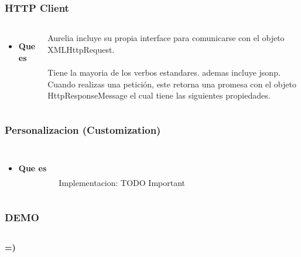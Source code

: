 \documentclass{beamer}
\begin{document}
\begin{frame}
\frametitle{HTTP Client}
\begin{columns}[c]
\begin{itemize}
\item \textbf{Que es}
\end{itemize}

Aurelia incluye su propia interface para comunicarse con el objeto XMLHttpRequest.
\\~\\
Tiene la mayoria de los verbos estandares. ademas incluye jsonp.
Cuando realizas una petición, este retorna una promesa con el objeto HttpResponseMessage el cual tiene las siguientes propiedades.
\end{columns}
\end{frame}
\begin{frame}
\frametitle{Personalizacion (Customization)}
\begin{columns}[c]
\begin{itemize}
\item \textbf{Que es}
\end{itemize}

\\~\\
Implementacion: TODO Important
\end{columns}
\end{frame}
\begin{frame}
\frametitle{DEMO}
\begin{columns}[c]
\textbf{=)}

\end{columns}
\end{frame}
\end{document}
